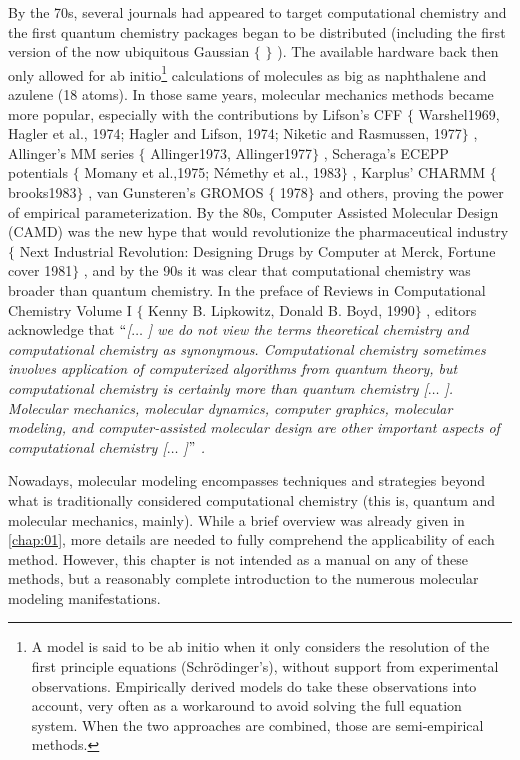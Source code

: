 By the 70s, several journals had appeared to target computational chemistry and the first quantum chemistry packages began to be distributed (including the first version of the now ubiquitous Gaussian $ \{ $ $ \} $ ). The available hardware back then only allowed for ab initio\footnote{ A model is said to be ab initio when it only considers the resolution of the first principle equations (Schrödinger’s), without support from experimental observations. Empirically derived models do take these observations into account, very often as a workaround to avoid solving the full equation system. When the two approaches are combined, those are semi-empirical methods.  } calculations of molecules as big as naphthalene and azulene (18 atoms). In those same years, molecular mechanics methods became more popular, especially with the contributions by Lifson’s CFF $ \{ $ Warshel1969, Hagler et al., 1974; Hagler and Lifson, 1974; Niketic and Rasmussen, 1977$ \} $ , Allinger’s MM series $ \{ $ Allinger1973, Allinger1977$ \} $ , Scheraga’s ECEPP potentials $ \{ $ Momany et al.,1975; Némethy et al., 1983$ \} $ , Karplus’ CHARMM $ \{ $ brooks1983$ \} $ , van Gunsteren’s GROMOS $ \{ $ 1978$ \} $  and others, proving the power of empirical parameterization. By the 80s, Computer Assisted Molecular Design (CAMD) was the new hype that would revolutionize the pharmaceutical industry $ \{ $ Next Industrial Revolution: Designing Drugs by Computer at Merck, Fortune cover 1981$ \} $ , and by the 90s it was clear that computational chemistry was broader than quantum chemistry. In the preface of Reviews in Computational Chemistry Volume I $ \{ $ Kenny B. Lipkowitz, Donald B. Boyd, 1990$ \} $ , editors acknowledge that \textit{$``$[$ \ldots $ ] we do not view the terms theoretical chemistry and computational chemistry as synonymous. Computational chemistry sometimes involves application of computerized algorithms from quantum theory, but computational chemistry is certainly more than quantum chemistry [$ \ldots $ ]. Molecular mechanics, molecular dynamics, computer graphics, molecular modeling, and computer-assisted molecular design are other important aspects of computational chemistry [$ \ldots $ ]$"$ .}

Nowadays, molecular modeling encompasses techniques and strategies beyond what is traditionally considered computational chemistry (this is, quantum and molecular mechanics, mainly). While a brief overview was already given in \autoref{chap:01}, more details are needed to fully comprehend the applicability of each method. However, this chapter is not intended as a manual on any of these methods, but a reasonably complete introduction to the numerous molecular modeling manifestations.

